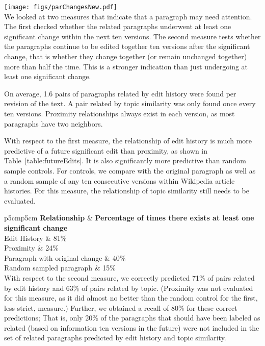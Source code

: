 \texttt{[image: figs/parChangesNew.pdf]}\\

We looked at two measures that indicate that a paragraph may need
attention. The first checked whether the related paragraphs underwent at
least one significant change within the next ten versions. The second
measure tests whether the paragraphs continue to be edited together ten
versions after the significant change, that is whether they change
together (or remain unchanged together) more than half the time. This is
a stronger indication than just undergoing at least one significant
change.

On average, 1.6 pairs of paragraphs related by edit history were found
per revision of the text. A pair related by topic similarity was only
found once every ten versions. Proximity relationships always exist in
each version, as most paragraphs have two neighbors.

With respect to the first measure, the relationship of edit history is
much more predictive of a future significant edit than proximity, as
shown in Table~{[}table:futureEdits{]}. It is also significantly more
predictive than random sample controls. For controls, we compare with
the original paragraph as well as a random sample of any ten consecutive
versions within Wikipedia article histories. For this measure, the
relationship of topic similarity still needs to be evaluated.

{\textbar{}p{5cm}\textbar{}p{5cm}\textbar{}} \textbf{Relationship} \&
\textbf{Percentage of times there exists at least one significant
change}\\Edit History \& 81\%\\

Proximity \& 24\%\\

Paragraph with original change \& 40\%\\

Random sampled paragraph \& 15\%\\

With respect to the second measure, we correctly predicted 71\% of pairs
related by edit history and 63\% of pairs related by topic. (Proximity
was not evaluated for this measure, as it did almost no better than the
random control for the first, less strict, measure.) Further, we
obtained a recall of 80\% for these correct predictions; That is, only
20\% of the paragraphs that should have been labeled as related (based
on information ten versions in the future) were not included in the set
of related paragraphs predicted by edit history and topic similarity.

